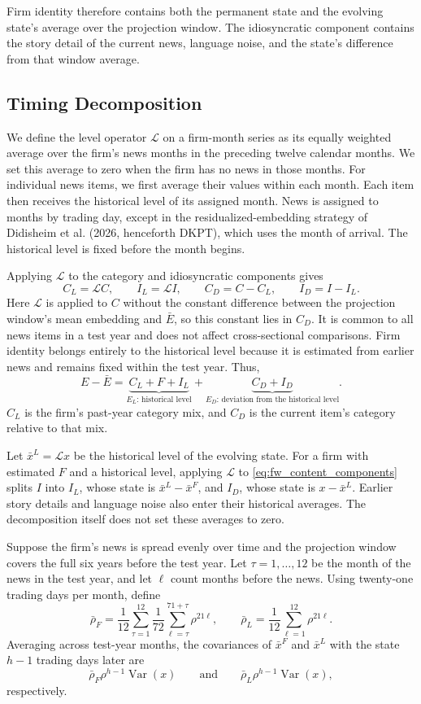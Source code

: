 \documentclass[11pt,letterpaper]{article}
\let\oldsubsection\subsection
\renewcommand{\subsection}{\FloatBarrier\oldsubsection}
\theoremstyle{remark}
\DeclareMathOperator{\Var}{Var}
\begin{document}
Firm identity therefore contains both the permanent state and the evolving state's average over the projection window. The idiosyncratic component contains the story detail of the current news, language noise, and the state's difference from that window average.

\subsection{Timing Decomposition}

We define the level operator $\mathcal L$ on a firm-month series as its equally weighted average over the firm's news months in the preceding twelve calendar months. We set this average to zero when the firm has no news in those months. For individual news items, we first average their values within each month. Each item then receives the historical level of its assigned month. News is assigned to months by trading day, except in the residualized-embedding strategy of Didisheim et al. (2026, henceforth DKPT), which uses the month of arrival. The historical level is fixed before the month begins.

Applying $\mathcal L$ to the category and idiosyncratic components gives
\[
C_L=\mathcal L C,
\qquad
I_L=\mathcal L I,
\qquad
C_D=C-C_L,
\qquad
I_D=I-I_L.
\]
Here $\mathcal L$ is applied to $C$ without the constant difference between the projection window's mean embedding and $\bar E$, so this constant lies in $C_D$. It is common to all news items in a test year and does not affect cross-sectional comparisons. Firm identity belongs entirely to the historical level because it is estimated from earlier news and remains fixed within the test year. Thus,
\[
E-\bar E
=
\underbrace{C_L+F+I_L}_{E_L\text{: historical level}}
+
\underbrace{C_D+I_D}_{E_D\text{: deviation from the historical level}}.
\]
$C_L$ is the firm's past-year category mix, and $C_D$ is the current item's category relative to that mix.

Let $\bar x^L=\mathcal L x$ be the historical level of the evolving state. For a firm with estimated $F$ and a historical level, applying $\mathcal L$ to \eqref{eq:fw_content_components} splits $I$ into $I_L$, whose state is $\bar x^L-\bar x^F$, and $I_D$, whose state is $x-\bar x^L$. Earlier story details and language noise also enter their historical averages. The decomposition itself does not set these averages to zero.

Suppose the firm's news is spread evenly over time and the projection window covers the full six years before the test year. Let $\tau=1,\ldots,12$ be the month of the news in the test year, and let $\ell$ count months before the news. Using twenty-one trading days per month, define
\[
\bar\rho_F
=
\frac{1}{12}\sum_{\tau=1}^{12}\frac{1}{72}
\sum_{\ell=\tau}^{71+\tau}\rho^{21\ell},
\qquad
\bar\rho_L
=
\frac{1}{12}\sum_{\ell=1}^{12}\rho^{21\ell}.
\]
Averaging across test-year months, the covariances of $\bar x^F$ and $\bar x^L$ with the state $h-1$ trading days later are
\[
\bar\rho_F\rho^{h-1}\Var(x)
\qquad\text{and}\qquad
\bar\rho_L\rho^{h-1}\Var(x),
\]
respectively.
\end{document}
